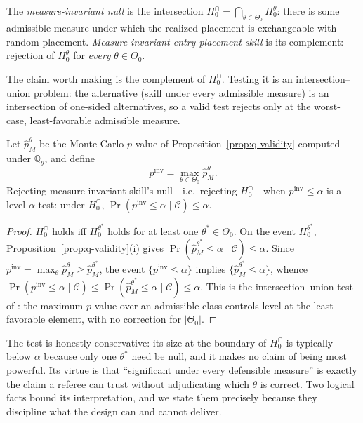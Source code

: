 \begin{definition}
\label{def:invariant}
The \emph{measure-invariant null} is the intersection
$H_0^{\cap}=\bigcap_{\theta\in\Theta_0}H_0^\theta$: there is some admissible
measure under which the realized placement is exchangeable with random placement.
\emph{Measure-invariant entry-placement skill} is its complement: rejection of
$H_0^\theta$ for \emph{every} $\theta\in\Theta_0$.
\end{definition}

The claim worth making is the complement of $H_0^{\cap}$. Testing it is an
intersection--union problem: the alternative (skill under every admissible
measure) is an intersection of one-sided alternatives, so a valid test rejects
only at the worst-case, least-favorable admissible measure.

\begin{proposition}
\label{prop:iut}
Let $\hat p_M^\theta$ be the Monte Carlo $p$-value of
Proposition~\ref{prop:q-validity} computed under $\mathbb{Q}_\theta$, and define
\[
p^{\mathrm{inv}}=\max_{\theta\in\Theta_0}\hat p_M^\theta .
\]
Rejecting measure-invariant skill's null---i.e.\ rejecting $H_0^{\cap}$---when
$p^{\mathrm{inv}}\le\alpha$ is a level-$\alpha$ test: under $H_0^{\cap}$,
$\Pr(p^{\mathrm{inv}}\le\alpha\mid\mathcal C)\le\alpha$.
\end{proposition}

\begin{proof}
$H_0^{\cap}$ holds iff $H_0^{\theta^\ast}$ holds for at least one
$\theta^\ast\in\Theta_0$. On the event $H_0^{\theta^\ast}$,
Proposition~\ref{prop:q-validity}(i) gives
$\Pr(\hat p_M^{\theta^\ast}\le\alpha\mid\mathcal C)\le\alpha$. Since
$p^{\mathrm{inv}}=\max_\theta\hat p_M^\theta\ge\hat p_M^{\theta^\ast}$, the event
$\{p^{\mathrm{inv}}\le\alpha\}$ implies $\{\hat p_M^{\theta^\ast}\le\alpha\}$,
whence
$\Pr(p^{\mathrm{inv}}\le\alpha\mid\mathcal C)\le\Pr(\hat
p_M^{\theta^\ast}\le\alpha\mid\mathcal C)\le\alpha$.
This is the intersection--union test of \cite{LehmannRomano2005}: the maximum
$p$-value over an admissible class controls level at the least favorable element,
with no correction for $|\Theta_0|$.
\end{proof}

The test is honestly conservative: its size at the boundary of $H_0^{\cap}$ is
typically below $\alpha$ because only one $\theta^\ast$ need be null, and it makes
no claim of being most powerful. Its virtue is that ``significant under every
defensible measure'' is exactly the claim a referee can trust without adjudicating
which $\theta$ is correct. Two logical facts bound its interpretation, and we
state them precisely because they discipline what the design can and cannot
deliver.

